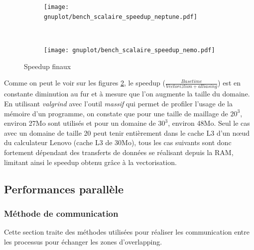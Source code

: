 \begin{figure}[!ht]
  \centering
  \begin{subfigure}[b]{0.5\textwidth}
    \centering
    \texttt{[image: gnuplot/bench\_scalaire\_speedup\_neptune.pdf]}
  \caption{\label{fig:bench_scal_neptune_speedup}}
  \end{subfigure}%
  ~
  \begin{subfigure}[b]{0.5\textwidth}
    \centering
    \texttt{[image: gnuplot/bench\_scalaire\_speedup\_nemo.pdf]}
  \caption{\label{fig:bench_scal_nemo_speedup}}
  \end{subfigure}
  \caption{\label{fig:bench_scal_speedups}Speedup finaux}
\end{figure}

Comme on peut le voir sur les figures \ref{fig:bench_scal_nemo_speedup}, le speedup ($\frac{Base time}{Vectoriztion+alliasing}$) est en constante diminution au fur et à mesure que l'on augmente la taille du domaine. En utilisant \textit{valgrind} avec l'outil \textit{massif} qui permet de profiler l'usage de la mémoire d'un programme, on constate que pour une taille de maillage de $20^3$, environ 27Mo sont utilisés et pour un domaine de $30^3$, environ 48Mo. Seul le cas avec un domaine de taille 20 peut tenir entièrement dans le cache L3 d'un nœud du calculateur Lenovo (cache L3 de 30Mo), tous les cas suivants sont donc fortement dépendant des transferts de données se réalisant depuis la RAM, limitant ainsi le speedup obtenu grâce à la vectorisation.

\subsection{Performances parallèle}


\subsubsection{Méthode de communication}
Cette section traite des méthodes utilisées pour réaliser les communication entre les processus pour échanger les zones d'overlapping.





